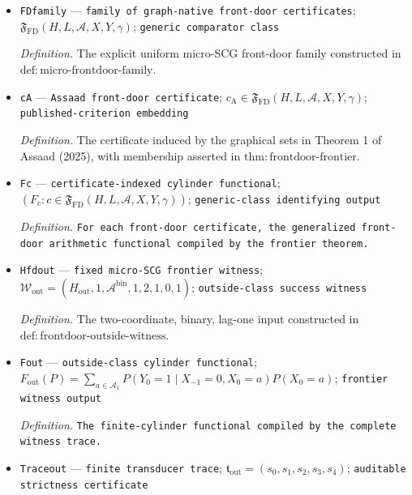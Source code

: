 \documentclass{article}
\begin{document}
\begin{itemize}
  \par\smallskip\noindent\emph{Definition.} A finite lag-template consisting of a radius, a nonempty mediator-role set, and an observed blocking-role set, subject to the uniform graphical conditions in \(\mathrm{def:micro\text{-}frontdoor\text{-}family}\).
  \item \texttt{FDfamily} --- \texttt{family of graph-\allowbreak{}native front-\allowbreak{}door certificates}; \(\mathfrak F_{\mathrm{FD}}(H,L,\mathcal A,X,Y,\gamma)\); \texttt{generic comparator class}
  \par\smallskip\noindent\emph{Definition.} The explicit uniform micro-SCG front-door family constructed in \(\mathrm{def:micro\text{-}frontdoor\text{-}family}\).
  \item \texttt{cA} --- \texttt{Assaad front-\allowbreak{}door certificate}; \(c_{\mathrm A}\in\mathfrak F_{\mathrm{FD}}(H,L,\mathcal A,X,Y,\gamma)\); \texttt{published-\allowbreak{}criterion embedding}
  \par\smallskip\noindent\emph{Definition.} The certificate induced by the graphical sets in Theorem 1 of Assaad (2025), with membership asserted in \(\mathrm{thm:frontdoor\text{-}frontier}\).
  \item \texttt{Fc} --- \texttt{certificate-\allowbreak{}indexed cylinder functional}; \((F_c:c\in\mathfrak F_{\mathrm{FD}}(H,L,\mathcal A,X,Y,\gamma))\); \texttt{generic-\allowbreak{}class identifying output}
  \par\smallskip\noindent\emph{Definition.} \texttt{For each front-\allowbreak{}door certificate,\allowbreak{} the generalized front-\allowbreak{}door arithmetic functional compiled by the frontier theorem.}
  \item \texttt{Hfdout} --- \texttt{fixed micro-\allowbreak{}SCG frontier witness}; \(\mathcal W_{\mathrm{out}}=(H_{\mathrm{out}},1,\mathcal A^{\mathrm{bin}},1,2,1,0,1)\); \texttt{outside-\allowbreak{}class success witness}
  \par\smallskip\noindent\emph{Definition.} The two-coordinate, binary, lag-one input constructed in \(\mathrm{def:frontdoor\text{-}outside\text{-}witness}\).
  \item \texttt{Fout} --- \texttt{outside-\allowbreak{}class cylinder functional}; \(F_{\mathrm{out}}(P)=\sum_{a\in\mathcal A_1}P(Y_0=1\mid X_{-1}=0,X_0=a)P(X_0=a)\); \texttt{frontier witness output}
  \par\smallskip\noindent\emph{Definition.} \texttt{The finite-\allowbreak{}cylinder functional compiled by the complete witness trace.}
  \item \texttt{Traceout} --- \texttt{finite transducer trace}; \(\mathfrak t_{\mathrm{out}}=(s_0,s_1,s_2,s_3,s_4)\); \texttt{auditable strictness certificate}

\end{itemize}
\end{document}
